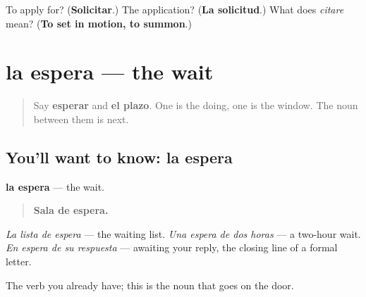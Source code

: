 \begin{tcolorbox}[breakable,colback=teal!4,colframe=teal!35!black,title={Before you move on}]
To apply for? (\textbf{Solicitar}.) The application? (\textbf{La solicitud}.) What does \emph{citare} mean? (\textbf{To set in motion, to summon}.)
\end{tcolorbox}
\section[la espera]{la espera — the wait}

\label{lesson:ES-C460-espera}



\begin{quote}
Say \textbf{esperar} and \textbf{el plazo}. One is the doing, one is the window. The noun between them is next.
\end{quote}

\subsection*{You'll want to know: la espera}
\textbf{la espera} — the wait.

\begin{quote}
\textbf{Sala de espera.}
\end{quote}

\emph{La lista de espera} — the waiting list. \emph{Una espera de dos horas} — a two-hour wait. \emph{En espera de su respuesta} — awaiting your reply, the closing line of a formal letter.

The verb you already have; this is the noun that goes on the door.

